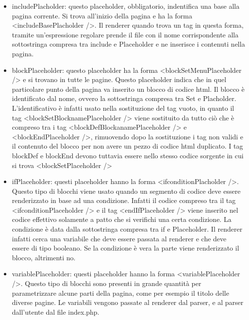 \begin{itemize}
    
	\item includePlacholder: questo placeholder, obbligatorio, indentifica una base alla pagina corrente. Si trova all'inizio della pagina e ha la forma <includeBasePlacholder />. Il renderer quando trova un tag in questa forma, tramite un'espressione
	regolare prende il file con il nome corrispondente alla sottostringa compresa tra include e Placeholder e ne inserisce i contenuti nella pagina.
	
    \item blockPlaceholder: questo placeholder ha la forma <blockSetMenuPlaceholder /> e si trovano in tutte le pagine. Questo placeholder indica che in quel particolare punto della pagina va inserito un blocco di codice html. Il blocco è identificato dal 
	nome, ovvero la sottostringa compresa tra Set e Placholder. L'identificativo è infatti usato nella sostituzione del tag vuoto, in quanto il tag <blockSetBlocknamePlaceholder /> viene sostituito da tutto ciò che è compreso tra i tag <blockDefBlockanamePlaceholder /> 
	e <blockEndPlaceholder />, rimuovendo dopo la sostituzione i tag non validi e il contenuto del blocco per non avere un pezzo di codice html duplicato. I tag blockDef e blockEnd devono tuttavia essere nello stesso codice 
	sorgente in cui si trova <blockSetPlaceholder />
	
	\item ifPlaceholder: questi placeholder hanno la forma <ifconditionPlacholder />. Questo tipo di blocchi viene usato quando un segmento di codice deve essere renderizzato in base ad una condizione. Infatti il codice compreso tra il tag <ifconditionPlaceholder /> 
	e il tag <endIfPlaceholder /> viene inserito nel codice effettivo solamente a patto che si verifichi una certa condizione. La condizione è data dalla sottostringa compresa tra if e Placeholder. Il renderer infatti cerca una variabile che deve essere passata
	al renderer e che deve essere di tipo booleano. Se la condizione è vera la parte viene renderizzato il blocco, altrimenti no.
	
	\item variablePlaceholder: questi placeholder hanno la forma <variablePlaceholder />. Questo tipo di blocchi sono presenti in grande quantità per parametrizzare alcune parti della pagina, come per esempio il titolo delle diverse pagine. Le variabili vengono 
	passate al renderer dal parser, e al parser dall'utente dal file index.php.
	
\end{itemize}


